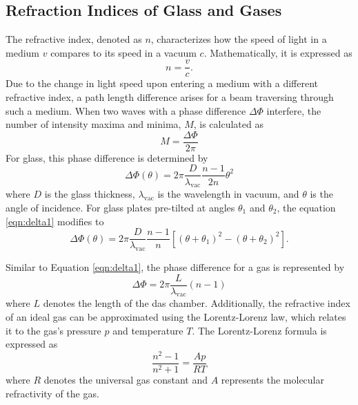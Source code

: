 \subsection{Refraction Indices of Glass and Gases}
The refractive index, denoted as $n$, characterizes how the speed of light in a medium $v$ 
compares to its speed in a vacuum $c$. Mathematically, it is expressed as
\begin{equation*}
    n=\frac{v}{c}.
\end{equation*}
Due to the change in light speed upon entering a medium with a different refractive index, 
a path length difference arises for a beam traversing through such a medium. 
When two waves with a phase difference $\Delta\Phi$ interfere, the number of intensity 
maxima and minima, $M$, is calculated as
\begin{equation}
    M=\frac{\Delta\Phi}{2\pi}
    \label{eqn:M}
\end{equation}
For glass, this phase difference is determined by
\begin{equation}
    \Delta\Phi(\theta)=2\pi\frac{D}{\lambda_\text{vac}}\frac{n-1}{2n}\theta^2
    \label{eqn:delta1}
\end{equation}
where $D$ is the glass thickness, $\lambda_\text{vac}$ is the wavelength in vacuum, and $\theta$ 
is the angle of incidence. For glass plates pre-tilted at angles $\theta_1$ and $\theta_2$, 
the equation \eqref{eqn:delta1} modifies to
\begin{equation}
    \Delta\Phi(\theta)=2\pi\frac{D}{\lambda_\text{vac}}\frac{n-1}{n}[(\theta+\theta_1)^2-(\theta+\theta_2)^2].
    \label{eqn:delta}
\end{equation}

Similar to Equation \eqref{eqn:delta1}, the phase difference for a gas is represented by
\begin{equation*}
    \Delta\Phi=2\pi\frac{L}{\lambda_\text{vac}}(n-1)
\end{equation*}
where $L$ denotes the length of the das chamber.
Additionally, the refractive index of an ideal gas can be approximated using the Lorentz-Lorenz law, 
which relates it to the gas's pressure $p$ and temperature $T$. The Lorentz-Lorenz formula is expressed as
\begin{equation}
    \frac{n^2-1}{n^2+1}=\frac{Ap}{RT}
    \label{eqn:LLL}
\end{equation}
where $R$ denotes the universal gas constant and $A$ represents the molecular refractivity of the gas.
